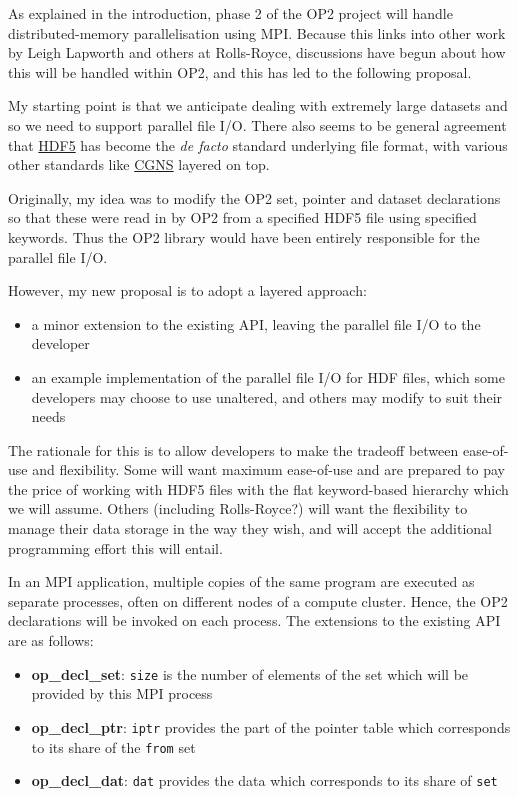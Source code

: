 \documentclass[11pt]{article}
\begin{document}
As explained in the introduction, phase 2 of the OP2 project will handle 
distributed-memory parallelisation using MPI.  Because this links into other
work by Leigh Lapworth and others at Rolls-Royce, discussions have
begun about how this will be handled within OP2, and this has led to the 
following proposal.

My starting point is that we anticipate dealing with extremely large datasets
and so we need to support parallel file I/O.  There also seems to be
general agreement that 
\href{http://www.hdfgroup.org/HDF5/}{HDF5}
has become the {\it de facto} standard underlying file format, 
with various other standards like
\href{http://cgns.sourceforge.net/hdf5.html}{CGNS}
layered on top.

Originally, my idea was to modify the OP2 set, pointer and dataset declarations
so that these were read in by OP2 from a specified HDF5 file using specified 
keywords.  Thus the OP2 library would have been entirely responsible for the 
parallel file I/O.

However, my new proposal is to adopt a layered approach:
\begin{itemize}
\item
a minor extension to the existing API, leaving the parallel file I/O to the 
developer

\item
an example implementation of the parallel file I/O for HDF files, which some
developers may choose to use unaltered, and others may modify to suit their needs
\end{itemize}

The rationale for this is to allow developers to make the tradeoff between 
ease-of-use and flexibility.  Some will want maximum ease-of-use and are prepared 
to pay the price of working with HDF5 files with the flat keyword-based hierarchy
which we will assume.  Others (including Rolls-Royce?) will want the flexibility 
to manage their data storage in the way they wish, and will accept the additional
programming effort this will entail.

In an MPI application, multiple copies of the same program are executed as
separate processes, often on different nodes of a compute cluster.  Hence, the 
OP2 declarations will be invoked on each process.  The extensions to the existing 
API are as follows:
\begin{itemize}
\item {\bf op\_decl\_set}: {\tt size} is the number of elements of the set which
will be provided by this MPI process

\item {\bf op\_decl\_ptr}: {\tt iptr} provides the part of the pointer table 
which corresponds to its share of the {\tt from} set

\item {\bf op\_decl\_dat}: {\tt dat} provides the data which corresponds to its 
share of {\tt set}
\end{itemize}
\end{document}
